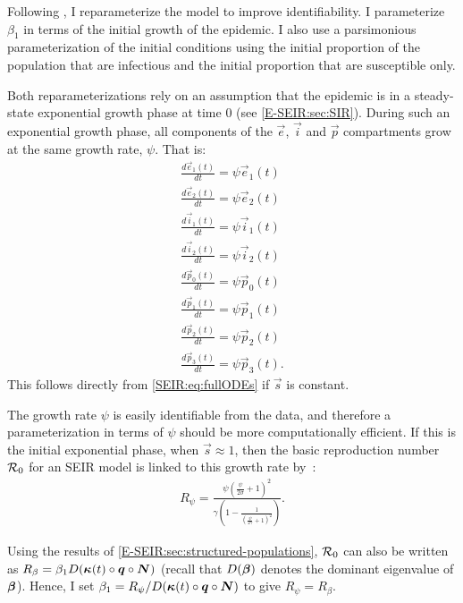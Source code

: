 \documentclass[thesis.tex]{subfiles}
\begin{document}
Following \textcite{birrellBayesian}, I reparameterize the model to improve identifiability.
I parameterize $\beta_1$ in terms of the initial growth of the epidemic.
I also use a parsimonious parameterization of the initial conditions using the initial proportion of the population that are infectious and the initial proportion that are susceptible only.

Both reparameterizations rely on an assumption that the epidemic is in a steady-state exponential growth phase at time 0 (see \cref{E-SEIR:sec:SIR}). During such an exponential growth phase, all components of the $\vec{e}$, $\vec{i}$ and $\vec{p}$ compartments grow at the same growth rate, $\psi$.
That is:
\begin{equation}
\begin{aligned}
\frac{d\vec{e}_1(t)}{dt} = \psi \vec{e}_1(t) \\
\frac{d\vec{e}_2(t)}{dt} = \psi \vec{e}_2(t) \\
\frac{d\vec{i}_1(t)}{dt} = \psi \vec{i}_1(t) \\
\frac{d\vec{i}_2(t)}{dt} = \psi \vec{i}_2(t) \\
\frac{d\vec{p}_0(t)}{dt} = \psi \vec{p}_0(t) \\
\frac{d\vec{p}_1(t)}{dt} = \psi \vec{p}_1(t) \\
\frac{d\vec{p}_2(t)}{dt} = \psi \vec{p}_2(t) \\
\frac{d\vec{p}_3(t)}{dt} = \psi \vec{p}_3(t).
\end{aligned}
\label{SEIR:eq:exponential-growth}
\end{equation}
This follows directly from \cref{SEIR:eq:fullODEs} if $\vec{s}$ is constant. 

The growth rate $\psi$ is easily identifiable from the data, and therefore a parameterization in terms of $\psi$ should be more computationally efficient.
If this is the initial exponential phase, when $\vec{s} \approx 1$, then the basic reproduction number $\mathcal{R}_{0}$ for an SEIR model is linked to this growth rate by~\autocite{birrellBayesian,wearingAppropriate}:
\begin{align}
    R_{\psi} = \frac{\psi \left( \frac{\psi}{2\sigma} + 1 \right)^2}{\gamma \left(1 - \frac{1}{\left(\frac{\psi}{2 \gamma} + 1 \right)^2} \right)} \label{SEIR:eq:rtoR}.
\end{align}

Using the results of \cref{E-SEIR:sec:structured-populations}, $\mathcal{R}_{0}$ can also be written as $R_{\beta} = \beta_1 D(\bm{\kappa}(t) \circ \bm{q} \circ \bm{N})$ (recall that $D(\bm{\beta})$ denotes the dominant eigenvalue of $\bm{\beta}$).
Hence, I set $\beta_1 = R_\psi / D(\bm{\kappa}(t) \circ \bm{q} \circ \bm{N})$ to give $R_\psi = R_\beta$.
\end{document}
